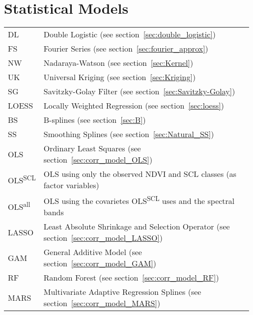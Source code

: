 \section*{Statistical Models}\vspace{-0.2cm}
\begin{longtable}{p{0.12\linewidth} p{0.87\linewidth}}
	DL
		& Double Logistic (see section~\ref{sec:double_logistic})\\
	FS
		& Fourier Series (see section~\ref{sec:fourier_approx})\\
	NW
		& Nadaraya-Watson (see section~\ref{sec:Kernel})\\
	UK
		& Universal Kriging (see section~\ref{sec:Kriging})\\
	SG
		& Savitzky-Golay Filter (see section~\ref{sec:Savitzky-Golay})\\
	LOESS
		& Locally Weighted Regression (see section~\ref{sec:loess})\\
	BS
		& B-splines (see section~\ref{sec:B})\\
	SS
		& Smoothing Splines (see section~\ref{sec:Natural_SS})\\
	OLS
		& Ordinary Least Squares (see section~\ref{sec:corr_model_OLS})\\
	OLS\textsuperscript{SCL}
		& OLS using only the observed NDVI and SCL classes (as factor variables)\\
	OLS\textsuperscript{all}
		& OLS using the covarietes OLS\textsuperscript{SCL} uses and the spectral bands\\
	LASSO
		& Least Absolute Shrinkage and Selection Operator (see section~\ref{sec:corr_model_LASSO})\\
	GAM
		& General Additive Model (see section~\ref{sec:corr_model_GAM})\\
	RF
		& Random Forest (see section~\ref{sec:corr_model_RF})\\
	MARS
		& Multivariate Adaptive Regression Splines (see section~\ref{sec:corr_model_MARS})\\
\end{longtable} \renewcommand{\arraystretch}{1}












